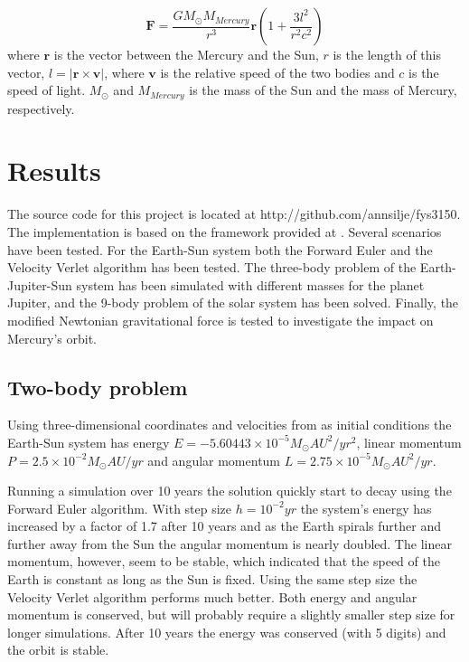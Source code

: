 \documentclass{article}
\begin{document}
\begin{equation}
\bm{F} = \frac{GM_{\odot}M_{Mercury}}{r^3}\bm{r}\left(1 + \frac{3l^2}{r^2c^2}\right) 
\label{eq:grav_gr}
\end{equation}
where $\bm{r}$ is the vector between the Mercury and the Sun, $r$ is the length of this vector, $l = |\bm{r}\times \bm{v}|$, where $\bm{v}$ is the relative speed of the two bodies and $c$ is the speed of light. $M_{\odot}$ and $M_{Mercury}$ is the mass of the Sun and the mass of Mercury, respectively.

\section{Results}
\label{sec:results}
The source code for this project is located at http://github.com/annsilje/fys3150. The implementation is based on the framework provided at \cite{framework}. Several scenarios have been tested. For the Earth-Sun system both the Forward Euler and the Velocity Verlet algorithm has been tested. The three-body problem of the Earth-Jupiter-Sun system has been simulated with different masses for the planet Jupiter, and the 9-body problem of the solar system has been solved. Finally, the modified Newtonian gravitational force is tested to investigate the impact on Mercury's orbit. 


\subsection{Two-body problem}
Using three-dimensional coordinates and velocities from \cite{eph} as initial conditions the Earth-Sun system has energy $E=-5.60443 \times 10^{-5} M_{\odot}AU^2/yr^2$, linear momentum $P=2.5\times 10^{-2} M_{\odot}AU/yr$ and angular momentum $L=2.75 \times 10^{-5} M_{\odot}AU^2/yr$. 

Running a simulation over 10 years the solution quickly start to decay using the Forward Euler algorithm. With step size $h=10^{-2}yr$ the system's energy has increased by a factor of 1.7 after 10 years and as the Earth spirals further and further away from the Sun the angular momentum is nearly doubled. The linear momentum, however, seem to be stable, which indicated that the speed of the Earth is constant as long as the Sun is fixed. Using the same step size the Velocity Verlet algorithm performs much better. Both energy and angular momentum is conserved, but will probably require a slightly smaller step size for longer simulations. After 10 years the energy was conserved (with 5 digits) and the orbit is stable.
\end{document}
